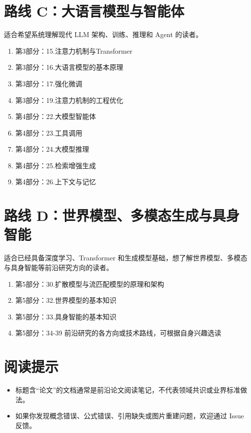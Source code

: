 \hypertarget{ux8defux7ebf-cux5927ux8bedux8a00ux6a21ux578bux4e0eux667aux80fdux4f53}{%
\section{路线 C：大语言模型与智能体}\label{ux8defux7ebf-cux5927ux8bedux8a00ux6a21ux578bux4e0eux667aux80fdux4f53}}

适合希望系统理解现代 LLM 架构、训练、推理和 Agent 的读者。

\begin{enumerate}
\def\labelenumi{\arabic{enumi}.}
\tightlist
\item
  第3部分：15.注意力机制与Transformer
\item
  第3部分：16.大语言模型的基本原理
\item
  第3部分：17.强化微调
\item
  第3部分：19.注意力机制的工程优化
\item
  第4部分：22.大模型智能体
\item
  第4部分：23.工具调用
\item
  第4部分：24.大模型推理
\item
  第4部分：25.检索增强生成
\item
  第4部分：26.上下文与记忆
\end{enumerate}

\hypertarget{ux8defux7ebf-dux4e16ux754cux6a21ux578bux591aux6a21ux6001ux751fux6210ux4e0eux5177ux8eabux667aux80fd}{%
\section{路线 D：世界模型、多模态生成与具身智能}\label{ux8defux7ebf-dux4e16ux754cux6a21ux578bux591aux6a21ux6001ux751fux6210ux4e0eux5177ux8eabux667aux80fd}}

适合已经具备深度学习、Transformer 和生成模型基础，想了解世界模型、多模态与具身智能等前沿研究方向的读者。

\begin{enumerate}
\def\labelenumi{\arabic{enumi}.}
\tightlist
\item
  第5部分：30.扩散模型与流匹配模型的原理和架构
\item
  第5部分：32.世界模型的基本知识
\item
  第5部分：33.具身智能的基本知识
\item
  第5部分：34-39 前沿研究的各方向或技术路线，可根据自身兴趣选读
\end{enumerate}

\hypertarget{ux9605ux8bfbux63d0ux793a}{%
\section{阅读提示}\label{ux9605ux8bfbux63d0ux793a}}

\begin{itemize}
\tightlist
\item
  标题含``论文''的文档通常是前沿论文阅读笔记，不代表领域共识或业界标准做法。
\item
  如果你发现概念错误、公式错误、引用缺失或图片重建问题，欢迎通过 Issue 反馈。
\end{itemize}

\clearpage
